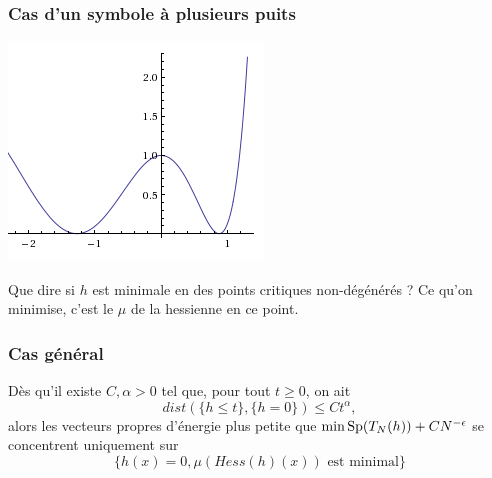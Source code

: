 \documentclass[mathserif]{beamer}
\begin{document}
\begin{frame}
  \frametitle{Cas d'un symbole à plusieurs puits}
   \begin{minipage}[l]{0.3\linewidth}
     \includegraphics[width=\linewidth]{wells.png}
   \end{minipage}
   \begin{minipage}[r]{0.65\linewidth}
     Que dire si $h$ est minimale en des points critiques non-dégénérés
     ?
     Ce qu'on minimise, c'est le $\mu$ de la hessienne en ce point.
     \end{minipage}
\end{frame}

\begin{frame}
  \frametitle{Cas g\'en\'eral}
  \begin{thm}[D.]
    D\`es qu'il existe $C,\alpha>0$ tel que, pour tout $t\geq 0$, on ait
    \[
      dist(\{h\leq t\},\{h=0\})\leq Ct^{\alpha},
    \]
    alors les vecteurs propres d'énergie plus petite que $\min
    \operatorname{Sp}(T_N(h))+CN^{-\epsilon}$ se concentrent uniquement sur
    \[
      \{h(x)=0, \mu(Hess(h)(x))\text{ est minimal}\}
    \]
  \end{thm}
\end{frame}
\end{document}
